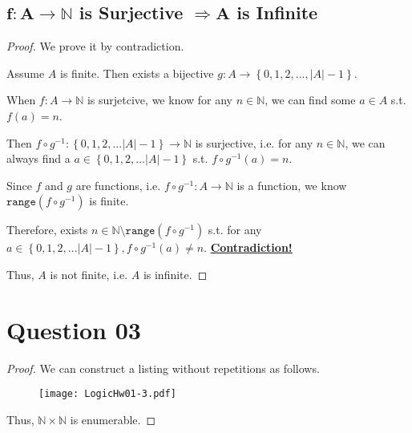 \documentclass{article}
\newcommand{\set}[1]{\left\{#1\right\}}
\begin{document}
\subsection{$\boldsymbol{f:A\rightarrow\mathbb{N}}$ is Surjective $\boldsymbol{\Rightarrow A}$ is Infinite}
\vspace{1em}
\begin{proof}
    We prove it by contradiction.
    
    \hspace{1.3em}
    Assume $A$ is finite. Then exists a bijective $g:A\to \set{0,1,2,...,|A|-1}$. 
    
    \hspace{1.3em}
    When $f:A\to\mathbb{N}$ is surjetcive, we know for any $n\in\mathbb{N}$, we can find some $a\in A$ s.t. $f(a)=n$.
    
    \hspace{1.3em}
    Then $f\circ g^{-1}: \set{0,1,2,...|A|-1}\to\mathbb{N}$ is surjective, i.e. for any $n\in\mathbb{N}$, we can always find a $a\in\set{0,1,2,...|A|-1}$ s.t. $f\circ g^{-1}(a)=n.$
    
    \hspace{1.3em}
    Since $f$ and $g$ are functions, i.e. $f\circ g^{-1}:A\to\mathbb{N}$ is a function, we know $\mathtt{range}(f\circ g^{-1})$ is finite.

    \hspace{1.3em}
    Therefore, exists $n\in\mathbb{N}\setminus\mathtt{range}(f\circ g^{-1})$ s.t. for any $a\in\set{0,1,2,...|A|-1}, f\circ g^{-1}(a)\neq n.$ \underline{\textbf{Contradiction!}}
    
    \hspace{1.3em}
    Thus, $A$ is not finite, i.e. $A$ is infinite.
\end{proof}

\vspace{1em}
\section{Question 03}
\vspace{1em}
\begin{proof}
    We can construct a listing without repetitions as follows.

    \begin{figure}[htbp]
    	\centering
    	{\texttt{[image: LogicHw01-3.pdf]}}
    \end{figure}

    \vspace{-1em} \hspace{1.3em}
    Thus, $\mathbb{N}\times\mathbb{N}$ is enumerable.
\end{proof}
    
\end{document}

